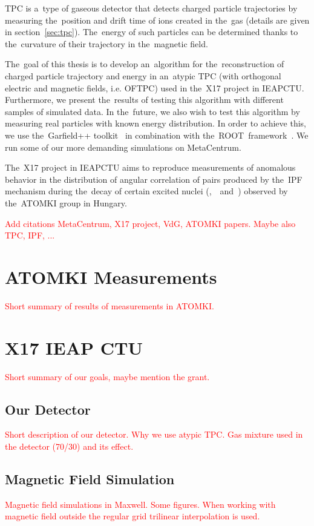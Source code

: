 	\ac{TPC} is a~type of gaseous detector that detects charged particle trajectories by measuring the~position and drift time of ions created in the~gas (details are given in section~\ref{sec:tpc}). The~energy of such particles can be determined thanks to the~curvature of their trajectory in the~magnetic field.
	
	The~goal of this thesis is to develop an~algorithm for the~reconstruction of charged particle trajectory and energy in an~atypic \ac{TPC} (with orthogonal electric and magnetic fields, i.e. \ac{OFTPC}) used in the~X17 project in \ac{IEAPCTU}. Furthermore, we present the~results of testing this algorithm with different samples of simulated data. In the~future, we also wish to test this algorithm by measuring real particles with known energy distribution. In order to achieve this, we use the~Garfield++ toolkit~\cite{Garfield++} in combination with the~ROOT~framework~\cite{ROOT}. We run some of our more demanding simulations on MetaCentrum.
	
	The~X17 project in \ac{IEAPCTU} aims to reproduce measurements of anomalous behavior in the distribution of angular correlation of pairs produced by the~\ac{IPF} mechanism during the~decay of certain excited nuclei (,~~and~) observed by the~ATOMKI group in Hungary. 
	
	\textcolor{red}{Add citations MetaCentrum, X17 project, VdG, ATOMKI papers. Maybe also TPC, IPF, ...}
	
	\section{ATOMKI Measurements}
	\textcolor{red}{Short summary of results of measurements in ATOMKI.}
	
	\section{X17 IEAP CTU}
	\label{sec:IEAP}
		\textcolor{red}{Short summary of our goals, maybe mention the grant.}
	
		\subsection{Our Detector}
		\textcolor{red}{Short description of our detector. Why we use atypic TPC. Gas mixture used in the detector (70/30) and its effect.}
		
		\subsection{Magnetic Field Simulation}
		\textcolor{red}{Magnetic field simulations in Maxwell. Some figures. When working with magnetic field outside the regular grid trilinear interpolation is used.}
		
